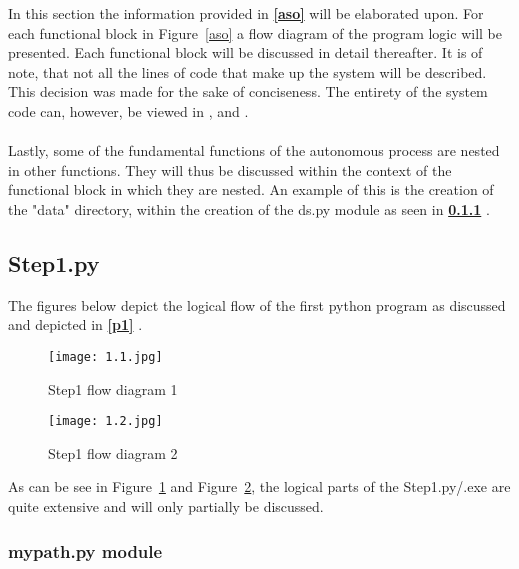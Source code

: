 In this section the information provided in \textbf{\ref{aso} } will be elaborated upon. For each functional block in Figure~\ref{aso} a flow diagram of the program logic will be presented. Each functional block will be discussed in detail thereafter. It is of note, that not all the lines of code that make up the system will be described. This decision was made for the sake of conciseness. The entirety of the system code can, however, be viewed in \textbf{}, \textbf{} and \textbf{}.
\\\\
Lastly, some of the fundamental functions of the autonomous process are nested in other functions. They will thus be discussed within the context of the functional block in which they are nested. An example of this is the creation of the "data" directory, within the creation of the ds.py module as seen in \textbf{\ref{mypath} }.

\newpage\cleardoublepage

\subsection{Step1.py}
\label{step1}

The figures below depict the logical flow of the first python program as discussed and depicted in \textbf{\ref{p1} }. 
\begin{figure}[H]
\begin{center}
\texttt{[image: 1.1.jpg]}
\caption{Step1 flow diagram 1}
\label{1.1}
\end{center}
\end{figure}

\begin{figure}[H]
\begin{center}
\texttt{[image: 1.2.jpg]}
\caption{Step1 flow diagram 2}
\label{1.2}
\end{center}
\end{figure}

As can be see in Figure~\ref{1.1} and Figure~\ref{1.2}, the logical parts of the Step1.py/.exe are quite extensive and will only partially be discussed. 

\subsubsection{mypath.py module}
\label{mypath}

